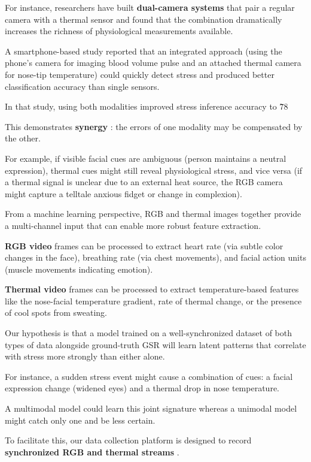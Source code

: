 For instance, researchers have built \textbf{dual-camera systems}
 that pair a regular camera with a thermal sensor and found that the combination dramatically increases the richness of physiological measurements available.

A smartphone-based study reported that an integrated approach (using the phone's camera for imaging blood volume pulse and an attached thermal camera for nose-tip temperature) could quickly detect stress and produced better classification accuracy than single sensors.

In that study, using both modalities improved stress inference accuracy to \~78%

This demonstrates \textbf{synergy}
: the errors of one modality may be compensated by the other.

For example, if visible facial cues are ambiguous (person maintains a neutral expression), thermal cues might still reveal physiological stress, and vice versa (if a thermal signal is unclear due to an external heat source, the RGB camera might capture a telltale anxious fidget or change in complexion).

From a machine learning perspective, RGB and thermal images together provide a multi-channel input that can enable more robust feature extraction.

\textbf{RGB video}
 frames can be processed to extract heart rate (via subtle color changes in the face), breathing rate (via chest movements), and facial action units (muscle movements indicating emotion).

\textbf{Thermal video}
 frames can be processed to extract temperature-based features like the nose-facial temperature gradient, rate of thermal change, or the presence of cool spots from sweating.

Our hypothesis is that a model trained on a well-synchronized dataset of both types of data alongside ground-truth GSR will learn latent patterns that correlate with stress more strongly than either alone.

For instance, a sudden stress event might cause a combination of cues: a facial expression change (widened eyes) and a thermal drop in nose temperature.

A multimodal model could learn this joint signature whereas a unimodal model might catch only one and be less certain.

To facilitate this, our data collection platform is designed to record \textbf{synchronized RGB and thermal streams}
.

